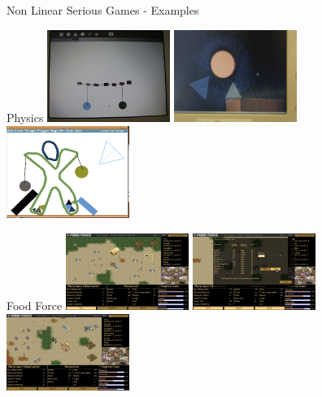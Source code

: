 \documentclass[compress]{beamer}
\begin{document}
\begin{frame}{Non Linear Serious Games - Examples}
\begin{block}{Physics}
    \centering
    \includegraphics[width=0.3\textwidth]{images/Bridgependulum.jpg}
    \hspace{0.5em}
    \includegraphics[width=0.3\textwidth]{images/Housegolf.jpg}
    \hspace{0.5em}
    \includegraphics[width=0.3\textwidth]{images/PhysicsNew3.png}
\end{block}
\pause
\begin{block}{Food Force}
    \centering
    \includegraphics[width=0.3\textwidth]{images/FoodForce2_Setup_Window.png}
    \hspace{0.5em}
    \includegraphics[width=0.3\textwidth]{images/FoodForce2_Market.png}
    \hspace{0.5em}
    \includegraphics[width=0.3\textwidth]{images/Foodforce-mp.png}
\end{block}
\end{frame}
\end{document}
